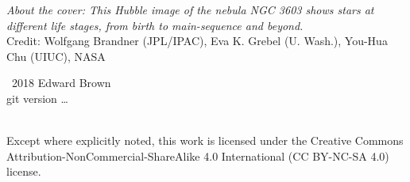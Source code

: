 
\maketitle
\newpage
\begin{fullwidth}
\thispagestyle{empty}

\vspace{3\baselineskip}
\noindent \textit{About the cover: This Hubble image of the nebula NGC 3603 shows stars at different life stages, from birth to main-sequence and beyond.} \\
\noindent Credit: Wolfgang Brandner (JPL/IPAC), Eva K. Grebel (U. Wash.), You-Hua Chu (UIUC), NASA

\vfill
\noindent \ccCopy\ 2018 Edward Brown\\
\noindent git version \ldots

\vspace{3\baselineskip}
\noindent \ccbyncsa \\
\noindent Except where explicitly noted, this work is licensed under the Creative Commons
Attribution-NonCommercial-ShareAlike 4.0 International (CC BY-NC-SA
4.0) license.

\end{fullwidth}

\newpage


\tableofcontents
\listoffigures
\listoftables
\listofsidebars
\listofexercises
